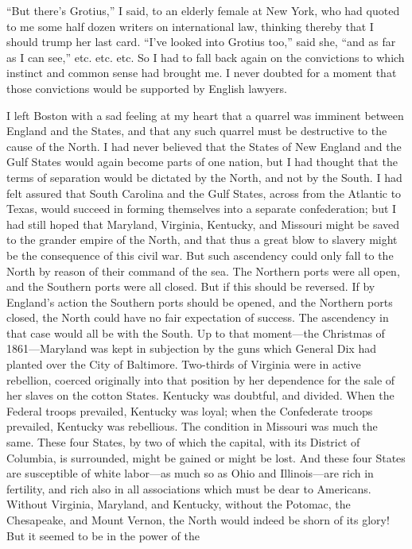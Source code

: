 ``But there's Grotius,'' I said, to an elderly female at New York,
who had quoted to me some half dozen writers on international law,
thinking thereby that I should trump her last card.  ``I've looked
into Grotius too,'' said she, ``and as far as I can see,'' etc. etc.
etc.  So I had to fall back again on the convictions to which
instinct and common sense had brought me.  I never doubted for a
moment that those convictions would be supported by English
lawyers.

I left Boston with a sad feeling at my heart that a quarrel was
imminent between England and the States, and that any such quarrel
must be destructive to the cause of the North.  I had never
believed that the States of New England and the Gulf States would
again become parts of one nation, but I had thought that the terms
of separation would be dictated by the North, and not by the South.
I had felt assured that South Carolina and the Gulf States, across
from the Atlantic to Texas, would succeed in forming themselves
into a separate confederation; but I had still hoped that Maryland,
Virginia, Kentucky, and Missouri might be saved to the grander
empire of the North, and that thus a great blow to slavery might be
the consequence of this civil war.  But such ascendency could only
fall to the North by reason of their command of the sea.  The
Northern ports were all open, and the Southern ports were all
closed.  But if this should be reversed.  If by England's action
the Southern ports should be opened, and the Northern ports closed,
the North could have no fair expectation of success.  The
ascendency in that case would all be with the South.  Up to that
moment---the Christmas of 1861---Maryland was kept in subjection by
the guns which General Dix had planted over the City of Baltimore.
Two-thirds of Virginia were in active rebellion, coerced originally
into that position by her dependence for the sale of her slaves on
the cotton States.  Kentucky was doubtful, and divided.  When the
Federal troops prevailed, Kentucky was loyal; when the Confederate
troops prevailed, Kentucky was rebellious.  The condition in
Missouri was much the same.  These four States, by two of which the
capital, with its District of Columbia, is surrounded, might be
gained or might be lost.  And these four States are susceptible of
white labor---as much so as Ohio and Illinois---are rich in
fertility, and rich also in all associations which must be dear to
Americans.  Without Virginia, Maryland, and Kentucky, without the
Potomac, the Chesapeake, and Mount Vernon, the North would indeed
be shorn of its glory!  But it seemed to be in the power of the
